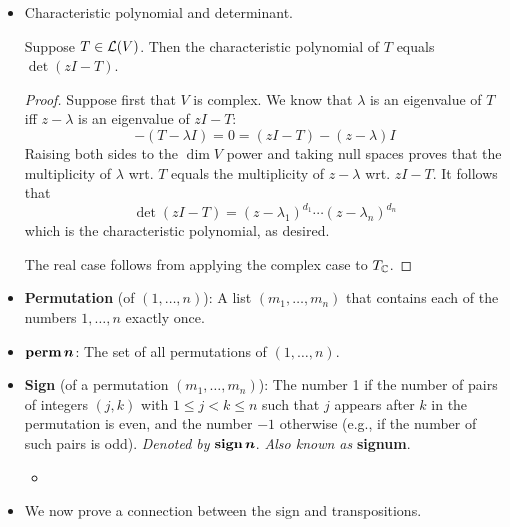 \documentclass[../main.tex]{subfiles}
\begin{document}
\begin{itemize}
\begin{theorem}
    \end{theorem}
    \item Characteristic polynomial and determinant.
    \begin{theorem}
        Suppose $T\in\mathcal{L}(V)$. Then the characteristic polynomial of $T$ equals $\det(zI-T)$.
        \begin{proof}
            Suppose first that $V$ is complex. We know that $\lambda$ is an eigenvalue of $T$ iff $z-\lambda$ is an eigenvalue of $zI-T$:
            \begin{equation*}
                -(T-\lambda I) = 0 = (zI-T)-(z-\lambda)I
            \end{equation*}
            Raising both sides to the $\dim V$ power and taking null spaces proves that the multiplicity of $\lambda$ wrt. $T$ equals the multiplicity of $z-\lambda$ wrt. $zI-T$. It follows that
            \begin{equation*}
                \det(zI-T) = (z-\lambda_1)^{d_1}\cdots(z-\lambda_n)^{d_n}
            \end{equation*}
            which is the characteristic polynomial, as desired.\par
            The real case follows from applying the complex case to $T_{\mathbb{C}}$.
        \end{proof}
    \end{theorem}
    \item \textbf{Permutation} (of $(1,\dots,n)$): A list $(m_1,\dots,m_n)$ that contains each of the numbers $1,\dots,n$ exactly once.
    \item $\bm{\perm n}$: The set of all permutations of $(1,\dots,n)$.
    \item \textbf{Sign} (of a permutation $(m_1,\dots,m_n)$): The number 1 if the number of pairs of integers $(j,k)$ with $1\leq j<k\leq n$ such that $j$ appears after $k$ in the permutation is even, and the number $-1$ otherwise (e.g., if the number of such pairs is odd). \emph{Denoted by} $\bm{\sign n}$. \emph{Also known as} \textbf{signum}.
    \begin{itemize}
        \item {}
    \end{itemize}
    \item We now prove a connection between the sign and transpositions.
    \begin{theorem}\label{trm:signTransposition}

\end{theorem}
\end{itemize}
\end{document}
